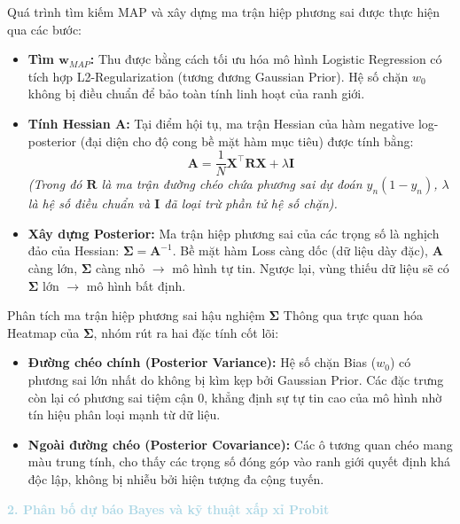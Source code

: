 Quá trình tìm kiếm MAP và xây dựng ma trận hiệp phương sai được thực hiện qua các bước:
\begin{itemize}
    \item \textbf{Tìm $\mathbf{w}_{MAP}$:} Thu được bằng cách tối ưu hóa mô hình Logistic Regression có tích hợp L2-Regularization (tương đương Gaussian Prior). Hệ số chặn $w_0$ không bị điều chuẩn để bảo toàn tính linh hoạt của ranh giới.
    \item \textbf{Tính Hessian $\mathbf{A}$:} Tại điểm hội tụ, ma trận Hessian của hàm negative log-posterior (đại diện cho độ cong bề mặt hàm mục tiêu) được tính bằng:
    \begin{equation}
        \mathbf{A} = \frac{1}{N} \mathbf{X}^\top \mathbf{R} \mathbf{X} + \lambda \mathbf{I}
    \end{equation}
    \textit{(Trong đó $\mathbf{R}$ là ma trận đường chéo chứa phương sai dự đoán $y_n(1-y_n)$, $\lambda$ là hệ số điều chuẩn và $\mathbf{I}$ đã loại trừ phần tử hệ số chặn).}
    \item \textbf{Xây dựng Posterior:} Ma trận hiệp phương sai của các trọng số là nghịch đảo của Hessian: $\mathbf{\Sigma} = \mathbf{A}^{-1}$. Bề mặt hàm Loss càng dốc (dữ liệu dày đặc), $\mathbf{A}$ càng lớn, $\mathbf{\Sigma}$ càng nhỏ $\rightarrow$ mô hình tự tin. Ngược lại, vùng thiếu dữ liệu sẽ có $\mathbf{\Sigma}$ lớn $\rightarrow$ mô hình bất định.
\end{itemize}

\begin{notebox}{Phân tích ma trận hiệp phương sai hậu nghiệm $\mathbf{\Sigma}$}
Thông qua trực quan hóa Heatmap của $\mathbf{\Sigma}$, nhóm rút ra hai đặc tính cốt lõi:
\begin{itemize}
    \item \textbf{Đường chéo chính (Posterior Variance):} Hệ số chặn Bias ($w_0$) có phương sai lớn nhất do không bị kìm kẹp bởi Gaussian Prior. Các đặc trưng còn lại có phương sai tiệm cận $0$, khẳng định sự tự tin cao của mô hình nhờ tín hiệu phân loại mạnh từ dữ liệu.
    \item \textbf{Ngoài đường chéo (Posterior Covariance):} Các ô tương quan chéo mang màu trung tính, cho thấy các trọng số đóng góp vào ranh giới quyết định khá độc lập, không bị nhiễu bởi hiện tượng đa cộng tuyến.
\end{itemize}
\end{notebox}

\vspace{0.5em}
\noindent\textcolor{lightblue}{\textbf{2. Phân bố dự báo Bayes và kỹ thuật xấp xỉ Probit}}
\vspace{0.5em}

